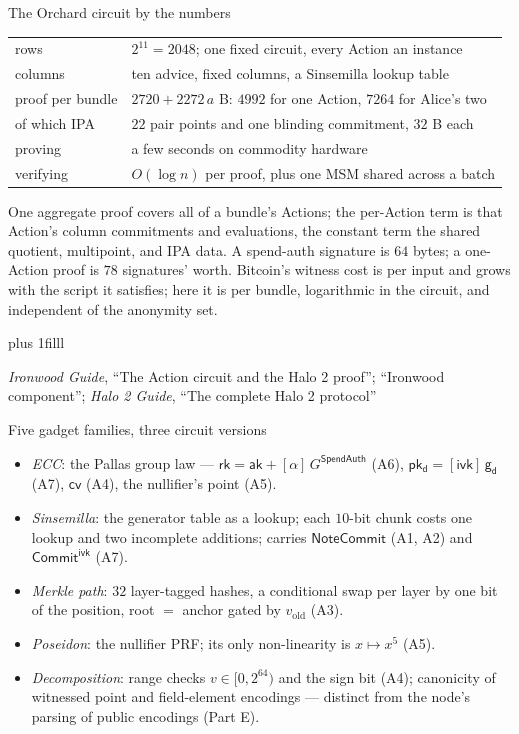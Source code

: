 \documentclass[aspectratio=169,11pt]{beamer}
\newcommand{\cvsym}{\ensuremath{\mathsf{cv}}}
\newcommand{\rksym}{\ensuremath{\mathsf{rk}}}
\newcommand{\gd}{\ensuremath{\mathsf{g_d}}}
\newcommand{\pkd}{\ensuremath{\mathsf{pk_d}}}
\newcommand{\aksym}{\ensuremath{\mathsf{ak}}}
\newcommand{\ivk}{\ensuremath{\mathsf{ivk}}}
\newcommand{\NoteCommit}{\ensuremath{\mathsf{NoteCommit}}}
\newcommand{\CommitIvk}{\ensuremath{\mathsf{Commit}^{\mathsf{ivk}}}}
\newcommand{\src}[1]{\par\vskip0pt plus 1filll
  {\fontsize{6}{7.2}\selectfont\color{arbdim}\raggedright #1\par}}
\begin{document}
\begin{frame}{The Orchard circuit by the numbers}
\begin{center}\small
\begin{tabular}{@{}ll@{}}
\toprule
rows & $2^{11} = 2048$; one fixed circuit, every Action an instance \\
columns & ten advice, fixed columns, a Sinsemilla lookup table \\
proof per bundle & $2720 + 2272\,a$ B: $4992$ for one Action, $7264$
  for Alice's two \\
of which IPA & $22$ pair points and one blinding commitment, $32$ B
  each \\
proving & a few seconds on commodity hardware \\
verifying & $O(\log n)$ per proof, plus one MSM shared across a batch \\
\bottomrule
\end{tabular}
\end{center}
One aggregate proof covers all of a bundle's Actions; the per-Action
term is that Action's column commitments and evaluations, the constant
term the shared quotient, multipoint, and IPA data. A spend-auth
signature is $64$ bytes; a one-Action proof is $78$ signatures' worth.
Bitcoin's witness cost is per input and grows with the script it
satisfies; here it is per bundle, logarithmic in the circuit, and
independent of the anonymity set.
\src{\emph{Ironwood Guide}, ``The Action circuit and the Halo 2 proof'';
``Ironwood component''; \emph{Halo 2 Guide}, ``The complete Halo 2 protocol''}
\end{frame}

\begin{frame}{Five gadget families, three circuit versions}
\begin{itemize}
  \item \emph{ECC}: the Pallas group law --- $\rksym = \aksym +
    [\alpha]\,G^{\mathsf{SpendAuth}}$ (A6), $\pkd = [\ivk]\,\gd$ (A7),
    $\cvsym$ (A4), the nullifier's point (A5).
  \item \emph{Sinsemilla}: the generator table as a lookup; each
    $10$-bit chunk costs one lookup and two incomplete additions;
    carries $\NoteCommit$ (A1, A2) and $\CommitIvk$ (A7).
  \item \emph{Merkle path}: $32$ layer-tagged hashes, a conditional swap
    per layer by one bit of the position, root $=$ anchor gated by
    $v_{\mathrm{old}}$ (A3).
  \item \emph{Poseidon}: the nullifier PRF; its only non-linearity is
    $x \mapsto x^5$ (A5).
  \item \emph{Decomposition}: range checks $v \in [0, 2^{64})$ and the
    sign bit (A4); canonicity of witnessed point and field-element
    encodings --- distinct from the node's parsing of public encodings
    (Part E).
\end{itemize}
\end{frame}
\end{document}
